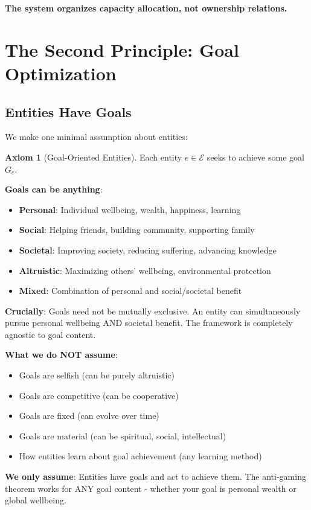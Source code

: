 \documentclass[11pt,a4paper]{article}
\theoremstyle{definition}
\newtheorem{axiom}[theorem]{Axiom}
\theoremstyle{remark}
\newcommand{\E}{\mathcal{E}}
\begin{document}
\textbf{The system organizes capacity allocation, not ownership relations.}

\section{The Second Principle: Goal Optimization}

\subsection{Entities Have Goals}

We make one minimal assumption about entities:

\begin{axiom}[Goal-Oriented Entities]
Each entity $e \in \E$ seeks to achieve some goal $G_e$.
\end{axiom}

\textbf{Goals can be anything}:
\begin{itemize}
\item \textbf{Personal}: Individual wellbeing, wealth, happiness, learning
\item \textbf{Social}: Helping friends, building community, supporting family
\item \textbf{Societal}: Improving society, reducing suffering, advancing knowledge
\item \textbf{Altruistic}: Maximizing others' wellbeing, environmental protection
\item \textbf{Mixed}: Combination of personal and social/societal benefit
\end{itemize}

\textbf{Crucially}: Goals need not be mutually exclusive. An entity can simultaneously pursue personal wellbeing AND societal benefit. The framework is completely agnostic to goal content.

\textbf{What we do NOT assume}:
\begin{itemize}
\item Goals are selfish (can be purely altruistic)
\item Goals are competitive (can be cooperative)
\item Goals are fixed (can evolve over time)
\item Goals are material (can be spiritual, social, intellectual)
\item How entities learn about goal achievement (any learning method)
\end{itemize}

\textbf{We only assume}: Entities have goals and act to achieve them. The anti-gaming theorem works for ANY goal content - whether your goal is personal wealth or global wellbeing.
\end{document}
